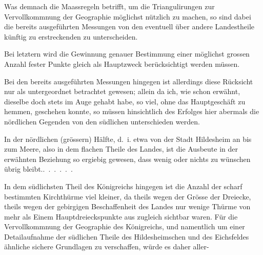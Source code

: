 Was demnach die Maassregeln betrifft, um die Triangulirungen zur Vervollkommnung
der Geographie möglichst nützlich zu machen, so sind dabei
die bereits ausgeführten Messungen von den eventuell über andere Landestheile
künftig zu erstreckenden zu unterscheiden.

Bei letztern wird die Gewinnung genauer Bestimmung einer möglichst
grossen Anzahl fester Punkte gleich als Hauptzweck berücksichtigt werden
müssen.

Bei den bereits ausgeführten Messungen hingegen ist allerdings diese
Rücksicht nur als untergeordnet betrachtet gewesen; allein da ich, wie schon
erwähnt, dieselbe doch stets im Auge gehabt habe, so viel, ohne das Hauptgeschäft
zu hemmen, geschehen konnte, so müssen hinsichtlich des Erfolges
hier abermals die nördlichen Gegenden von den südlichen unterschieden werden.

In der nördlichen (grössern) Hälfte, d.~i. etwa von der Stadt Hildesheim
an bis zum Meere, also in dem flachen Theile des Landes, ist die Ausbeute in
der erwähnten Beziehung so ergiebig gewesen, dass wenig oder nichts zu
wünschen übrig bleibt.\quad\mbox{.\ .\ .\ .\ .\ .}

In dem südlichsten Theil des Königreichs hingegen ist die Anzahl der
scharf bestimmten Kirchthürme viel kleiner, da theils wegen der Grösse der
Dreiecke, theils wegen der gebirgigen Beschaffenheit des Landes nur wenige
Thürme von mehr als Einem Hauptdreieckspunkte aus zugleich sichtbar waren.
Für die Vervollkommnung der Geographie des Königreichs, und namentlich
um einer Detailaufnahme der südlichen Theile des Hildesheimschen und des
Eichsfeldes ähnliche sichere Grundlagen zu verschaffen, würde es daher \mbox{aller-}
\par
